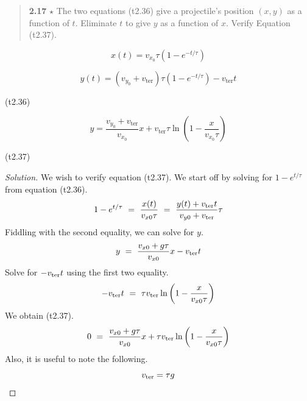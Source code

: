 \documentclass{article}
\numberwithin{equation}{section}
\begin{document}
\begin{quote}
\textbf{2.17} $\star$ The two equations (t2.36) give a projectile's position $(x, y)$ as a function of $t$. Eliminate $t$ to give $y$ as a function of $x$. Verify Equation (t2.37).
\end{quote}

\begin{equation}
x(t) = v_{x_0} \tau \left( 1 - e^{-t/\tau} \right)
\end{equation}

\begin{equation}
y(t) = \left( v_{y_0} + v_{\text{ter}} \right) \tau \left( 1 - e^{-t/\tau} \right) - v_{\text{ter}} t
\end{equation}

\hfill (t2.36)

\begin{equation}
y = \frac{v_{y_0} + v_{\text{ter}}}{v_{x_0}} x + v_{\text{ter}} \tau \ln \left( 1 - \frac{x}{v_{x_0} \tau} \right)
\end{equation}

\hfill (t2.37)


\begin{proof}[Solution]
    We wish to verify equation (t2.37). We start off by solving 
    for $1 - e^{t/\tau}$ from equation (t2.36). 
    \begin{equation}
        1 - e^{t/\tau} \ = \ 
        \frac {x(t)} {v_{x0} \tau} 
        \ = \ 
        \frac {y(t) + v_{\rm ter} t}{v_{y0}+v_{\rm ter}}\tau
    \end{equation}
    Fiddling with the second equality, we can solve for $y$. 
    \begin{equation}
        y \ = \ \frac {v_{x0} + g \tau} {v_{x0}}x - v_{\rm ter} t
    \end{equation}
    Solve for $-v_{\rm ter}t$ using the first two equality. 
    \begin{equation}
        -v_{\rm ter}t \ = \ \tau v_{\rm ter} \ln\left(1 - \frac x {v_{x0} \tau}\right)
    \end{equation}
    We obtain (t2.37). 
\begin{equation}
        0 \ = \ \frac {v_{x0} + g \tau} {v_{x0}}x + \tau v_{\rm ter} \ln\left(1 - \frac x {v_{x0} \tau}\right)
    \end{equation}
    Also, it is useful to note the following. 
    \begin{equation}
        v_{\rm ter} = \tau g
    \end{equation}
\end{proof}
\end{document}
